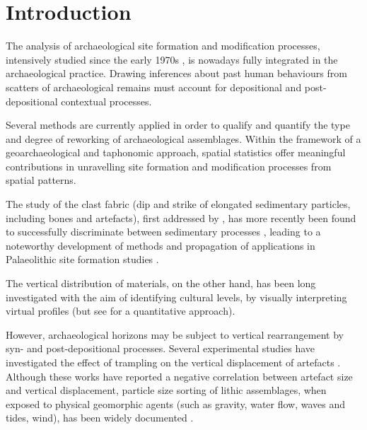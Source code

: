 \documentclass[review,authoryear,times]{elsarticle} %
\begin{document}

\section{Introduction}

The analysis of archaeological site formation and modification processes, intensively studied since the early 1970s \citep[][among others]{Isaac1967,Schiffer1972,Schiffer1983,Schiffer1987,Shackley1978,Wood1978,Schick1984,Schick1986,Schick1987,Petraglia1987,Petraglia1994}, is nowadays fully integrated in the archaeological practice. Drawing inferences about past human behaviours from scatters of archaeological remains must account for depositional and post-depositional contextual processes.

Several methods are currently applied in order to qualify and quantify the type and degree of reworking of archaeological assemblages. Within the framework of a geoarchaeological and taphonomic approach, spatial statistics offer meaningful contributions in unravelling site formation and modification processes from spatial patterns.

The study of the clast fabric (dip and strike of elongated sedimentary particles, including bones and artefacts), first addressed by \cite{Isaac1967,Bar-Yosef1972,Schick1986}, has more recently been found to successfully discriminate between sedimentary processes \citep{Bertran1995,Bertran1997}, leading to a noteworthy development of methods and propagation of applications in Palaeolithic site formation studies \citep[][among others]{Lenoble2004,Lenoble2008,McPherron2005,Benito-Calvo2009,Benito-Calvo2011,Benito-Calvo2011a,Bernatchez2010,Dominguez-Rodrigo2012,Garcia-Moreno2016,Sanchez-Romero2016}.

The vertical distribution of materials, on the other hand, has been long investigated with the aim of identifying cultural levels, by visually interpreting virtual profiles (but see \cite{Anderson2008} for a quantitative approach).

However, archaeological horizons may be subject to vertical rearrangement by syn- and post-depositional processes. Several experimental studies have investigated the effect of trampling on the vertical displacement of artefacts \citep{Villa1983a,Gifford-Gonzalez1985,Nielsen1991,Eren2010}. Although these works have reported a negative correlation between artefact size and vertical displacement, particle size sorting of lithic assemblages, when exposed to physical geomorphic agents (such as gravity, water flow, waves and tides, wind), has been widely documented \citep{Rick1976,Schick1986,Petraglia1987,Morton2004,Lenoble2005,Bertran2012}. %
\end{document}
